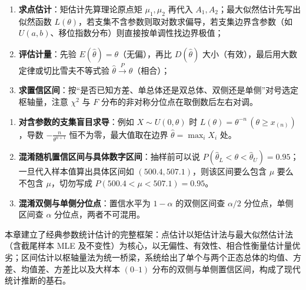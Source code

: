 \begin{method}[参数估计解题选型策略]
\begin{enumerate}
  \item \textbf{求点估计}：矩估计先算理论原点矩 $\mu_1,\mu_2$ 再代入 $A_1,A_2$；最大似然估计先写出似然函数 $L(\theta)$，若支集不含参数则取对数求偏导，若支集边界含参数（如 $U(a,b)$、移位指数分布）则直接按单调性找边界极值；
  \item \textbf{评估计量}：先验 $E(\hat{\theta})=\theta$（无偏），再比 $D(\hat{\theta})$ 大小（有效），最后用大数定律或切比雪夫不等式验 $\hat{\theta}\xrightarrow{P}\theta$（相合）；
  \item \textbf{求置信区间}：按“是否已知方差、单总体还是双总体、双侧还是单侧”对号选定枢轴量，注意 $\chi^2$ 与 $F$ 分布的非对称分位点在取倒数后左右对调。
\end{enumerate}
\end{method}

\begin{pitfall}[参数估计中的三类常见误区]
\begin{enumerate}
  \item \textbf{对含参数的支集盲目求导}：例如 $X\sim U(0,\theta)$ 时 $L(\theta)=\theta^{-n}\,(\theta\ge x_{(n)})$，导数 $-\frac{n}{\theta^{n+1}}$ 恒不为零，最大值取在边界 $\hat{\theta}=\max_i X_i$ 处。
  \item \textbf{混淆随机置信区间与具体数字区间}：抽样前可以说 $P(\hat{\theta}_L<\theta<\hat{\theta}_U)=0.95$；一旦代入样本值算出具体区间如 $(500.4,507.1)$，则该区间要么包含 $\mu$ 要么不包含 $\mu$，切勿写成 $P(500.4<\mu<507.1)=0.95$。
  \item \textbf{混淆双侧与单侧分位点}：置信水平为 $1-\alpha$ 的双侧区间查 $\alpha/2$ 分位点，单侧区间查 $\alpha$ 分位点，两者不可混用。
\end{enumerate}
\end{pitfall}

\begin{summary}[第七章核心脉络]
本章建立了经典参数统计估计的完整框架：点估计以矩估计法与最大似然估计法（含截尾样本 MLE 及不变性）为核心，以无偏性、有效性、相合性衡量估计量优劣；区间估计以枢轴量法为统一桥梁，系统给出了单个与两个正态总体的均值、方差、均值差、方差比以及大样本 $(0\text{--}1)$ 分布的双侧与单侧置信区间，构成了现代统计推断的基石。
\end{summary}
